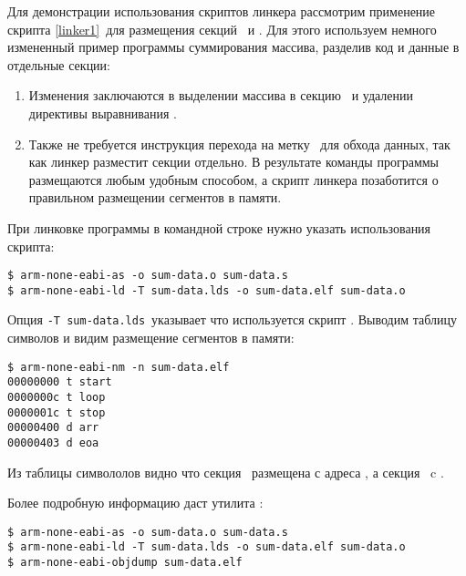 
Для демонстрации использования скриптов линкера рассмотрим применение скрипта
\ref{linker1}\ для размещения секций \ и . Для этого
используем немного измененный пример программы суммирования массива, разделив
код и данные в отдельные секции:


\begin{enumerate}
\item Изменения заключаются в выделении массива в секцию \ и
удалении директивы выравнивания .

\item Также не требуется инструкция перехода на метку \ 
для обхода данных, так как линкер разместит секции отдельно. В результате
команды программы размещаются любым удобным способом, а скрипт линкера 
позаботится о правильном размещении сегментов в памяти.
 
\end{enumerate}

При линковке программы в командной строке нужно указать использования скрипта:

\begin{verbatim}
$ arm-none-eabi-as -o sum-data.o sum-data.s
$ arm-none-eabi-ld -T sum-data.lds -o sum-data.elf sum-data.o
\end{verbatim}

Опция \verb|-T sum-data.lds|\ указывает что используется скрипт
. Выводим таблицу символов и видим размещение сегментов в
памяти:

\begin{verbatim}
$ arm-none-eabi-nm -n sum-data.elf
00000000 t start
0000000c t loop
0000001c t stop
00000400 d arr
00000403 d eoa
\end{verbatim}

Из таблицы символолов видно что секция \ размещена с адреса
\addr{0x0}, а секция \var{.data}\ c \addr{0x400}.


Более подробную информацию даст утилита :

\begin{verbatim}
$ arm-none-eabi-as -o sum-data.o sum-data.s
$ arm-none-eabi-ld -T sum-data.lds -o sum-data.elf sum-data.o
$ arm-none-eabi-objdump sum-data.elf
\end{verbatim}

